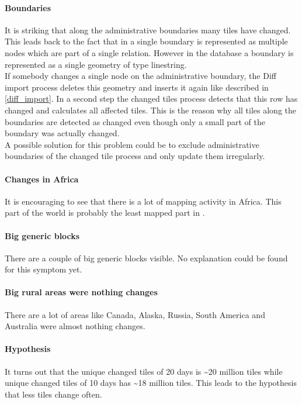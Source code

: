 \paragraph{Boundaries}
It is striking that along the administrative boundaries many tiles have changed. This leads back to the fact that in \osm{} a single boundary is represented as multiple nodes which are part of a single relation. However in the database a boundary is represented as a single geometry of type linestring.\\
If somebody changes a single node on the administrative boundary, the Diff import process deletes this geometry and inserts it again like described in \autoref{diff_import}. In a second step the changed tiles process detects that this row has changed and calculates all affected tiles. This is the reason why all tiles along the boundaries are detected as changed even though only a small part of the boundary was actually changed.\\
A possible solution for this problem could be to exclude administrative boundaries of the changed tile process and only update them irregularly.

\paragraph{Changes in Africa}

It is encouraging to see that there is a lot of mapping activity in Africa. This part of the world is probably the least mapped part in \osm{}.

\paragraph{Big generic blocks}

There are a couple of big generic blocks visible. No explanation could be found for this symptom yet.

\paragraph{Big rural areas were nothing changes}

There are a lot of areas like Canada, Alaska, Russia, South America and Australia were almost nothing changes.

\paragraph{Hypothesis}

It turns out that the unique changed tiles of 20 days is \textasciitilde 20 million tiles while unique changed tiles of 10 days has \textasciitilde 18 million tiles. This leads to the hypothesis that less tiles change often.
